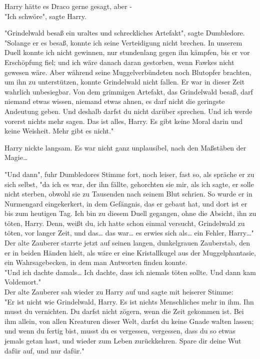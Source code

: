 {Harry hätte es Draco gerne gesagt, aber -\\ "Ich schwöre", sagte Harry.

"Grindelwald besaß ein uraltes und schreckliches Artefakt", sagte Dumbledore. "Solange er es besaß, konnte ich seine Verteidigung nicht brechen. In unserem Duell konnte ich nicht gewinnen, nur stundenlang gegen ihn kämpfen, bis er vor Erschöpfung fiel; und ich wäre danach daran gestorben, wenn Fawkes nicht gewesen wäre. Aber während seine Muggelverbündeten noch Blutopfer brachten, um ihn zu unterstützen, konnte Grindelwald nicht fallen. Er war in dieser Zeit wahrlich unbesiegbar. Von dem grimmigen Artefakt, das Grindelwald besaß, darf niemand etwas wissen, niemand etwas ahnen, es darf nicht die geringste Andeutung geben. Und deshalb darfst du nicht darüber sprechen. Und ich werde vorerst nichts mehr sagen. Das ist alles, Harry. Es gibt keine Moral darin und keine Weisheit. Mehr gibt es nicht."

Harry nickte langsam. Es war nicht ganz unplausibel, nach den Maßstäben der Magie…

"Und dann", fuhr Dumbledores Stimme fort, noch leiser, fast so, als spräche er zu sich selbst, "da ich es war, der ihn fällte, gehorchten sie mir, als ich sagte, er solle nicht sterben, obwohl sie zu Tausenden nach seinem Blut schrien. So wurde er in Nurmengard eingekerkert, in dem Gefängnis, das er gebaut hat, und dort ist er bis zum heutigen Tag. Ich bin zu diesem Duell gegangen, ohne die Absicht, ihn zu töten, Harry. Denn, weißt du, ich hatte schon einmal versucht, Grindelwald zu töten, vor langer Zeit, und das… das war… es erwies sich als… ein Fehler, Harry…"\\ Der alte Zauberer starrte jetzt auf seinen langen, dunkelgrauen Zauberstab, den er in beiden Händen hielt, als wäre er eine Kristallkugel aus der Muggelphantasie, ein Wahrsagebecken, in dem man Antworten finden konnte.\\ "Und ich dachte damals… Ich dachte, dass ich niemals töten sollte. Und dann kam Voldemort."\\ Der alte Zauberer sah wieder zu Harry auf und sagte mit heiserer Stimme:\\ "Er ist nicht wie Grindelwald, Harry. Es ist nichts Menschliches mehr in ihm. Ihn musst du vernichten. Du darfst nicht zögern, wenn die Zeit gekommen ist. Bei ihm allein, von allen Kreaturen dieser Welt, darfst du keine Gnade walten lassen; und wenn du fertig bist, musst du es vergessen, vergessen, dass du so etwas jemals getan hast, und wieder zum Leben zurückkehren. Spare dir deine Wut dafür auf, und nur dafür."

}
